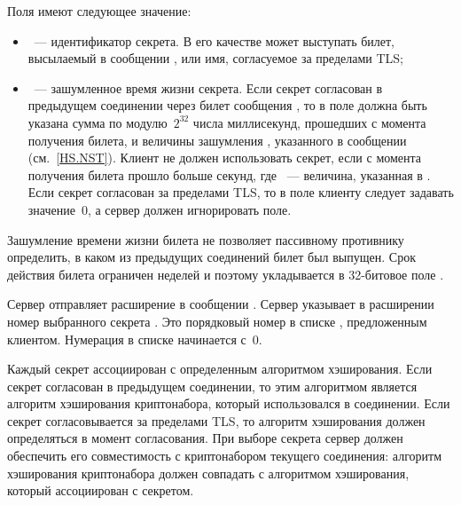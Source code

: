 Поля  имеют следующее значение:

\begin{itemize}
\item
{}~--- идентификатор секрета. В его качестве может выступать 
билет, высылаемый в сообщении , или имя, 
согласуемое за пределами TLS;
\item
{}~--- зашумленное время жизни секрета. 
%
Если секрет согласован в предыдущем соединении через билет сообщения
, то в поле должна быть указана сумма по 
модулю~$2^{32}$ числа миллисекунд, прошедших с момента получения билета, 
и величины зашумления , указанного в сообщении 
(см.~\ref{HS.NST}). 
%
Клиент не должен использовать секрет, если с момента получения билета прошло 
больше  секунд, где ~--- величина, 
указанная в .
%
Если секрет согласован за пределами TLS, то в поле 
клиенту следует задавать значение~$0$, а сервер должен игнорировать поле.
\end{itemize}

\begin{note*}
Зашумление времени жизни билета не позволяет пассивному противнику определить, 
в каком из предыдущих соединений билет был выпущен.
%
Срок действия билета ограничен неделей и поэтому укладывается в 32-битовое 
поле .
\end{note*}

Сервер отправляет расширение  в сообщении 
. Сервер указывает в расширении номер выбранного 
секрета . Это порядковый номер в списке 
, предложенным клиентом. Нумерация в списке  
начинается с~$0$.

Каждый секрет ассоциирован с определенным алгоритмом хэширования. 
%
Если секрет согласован в предыдущем соединении, то этим алгоритмом является
алгоритм хэширования криптонабора, который использовался в соединении.
%
Если секрет согласовывается за пределами TLS, то алгоритм хэширования должен 
определяться в момент согласования.
%
При выборе секрета сервер должен обеспечить его совместимость с криптонабором 
текущего соединения: алгоритм хэширования криптонабора должен совпадать с алгоритмом
хэширования, который ассоциирован с секретом.


